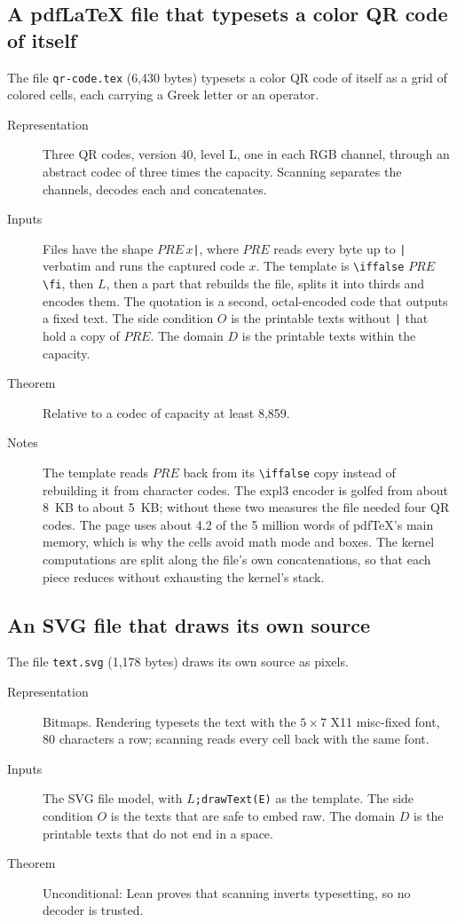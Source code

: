 \documentclass[11pt]{amsart}
\theoremstyle{definition}
\theoremstyle{remark}
\newcommand{\lean}[1]{\texttt{#1}}
\begin{document}
\subsection{A pdf\LaTeX{} file that typesets a color QR code of itself}
The file \lean{qr-code.tex} (6,430 bytes) typesets a color QR code of itself as a grid of colored
cells, each carrying a Greek letter or an operator.
\begin{description}
\item[Representation] Three QR codes, version 40, level L, one in each RGB channel, through an
abstract codec of three times the capacity. Scanning separates the channels, decodes each and
concatenates.
\item[Inputs] Files have the shape $\mathit{PRE}\,x$\verb+|+, where $\mathit{PRE}$ reads every byte
up to \verb+|+ verbatim and runs the captured code $x$. The template is \verb|\iffalse|
$\mathit{PRE}$ \verb|\fi|, then $L$, then a part that rebuilds the file, splits it into thirds and
encodes them. The quotation is a second, octal-encoded code that outputs a fixed text. The side
condition $O$ is the printable texts without \verb+|+ that hold a copy of $\mathit{PRE}$. The domain
$D$ is the printable texts
within the capacity.
\item[Theorem] Relative to a codec of capacity at least 8,859.
\item[Notes] The template reads $\mathit{PRE}$ back from its \verb|\iffalse| copy instead of
rebuilding it from character codes. The expl3 encoder is golfed from about 8~KB to about 5~KB;
without these two measures the file needed four QR codes. The page uses about 4.2 of the 5 million
words of pdf\TeX's main memory, which is why the cells avoid math mode and boxes. The kernel
computations are split along the file's own concatenations, so that each piece reduces without
exhausting the kernel's stack.
\end{description}

\subsection{An SVG file that draws its own source}
The file \lean{text.svg} (1,178 bytes) draws its own source as pixels.
\begin{description}
\item[Representation] Bitmaps. Rendering typesets the text with the $5 \times 7$ X11 misc-fixed
font, 80 characters a row; scanning reads every cell back with the same font.
\item[Inputs] The SVG file model, with $L$\verb|;drawText(E)| as the template. The side condition
$O$ is the texts that are safe to embed raw. The domain $D$ is the printable texts that do not
end in a space.
\item[Theorem] Unconditional: Lean proves that scanning inverts typesetting, so no decoder is
trusted.
\end{description}
\end{document}
